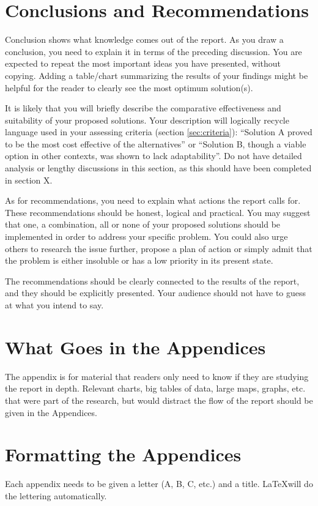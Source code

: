 \documentclass[peerreview]{IEEEtran}
\begin{document}
\section{Conclusions and Recommendations}
Conclusion shows what knowledge comes out of the report. As you draw a conclusion, you need to explain it in terms of the preceding discussion. You are expected to repeat the most important ideas you have presented, without copying. Adding a table/chart summarizing the results of your findings might be helpful for the reader to clearly see the most optimum solution(s).

It is likely that you will briefly describe the comparative effectiveness and suitability of your proposed solutions. Your description will logically recycle language used in your assessing criteria (section \ref{sec:criteria}): ``Solution A proved to be the most cost effective of the alternatives'' or ``Solution B, though a viable option in other contexts, was shown to lack adaptability''.  Do not have detailed analysis or lengthy discussions in this section, as this should have been completed in section X.

As for recommendations, you need to explain what actions the report calls for. These recommendations should be honest, logical and practical. You may suggest that one, a combination, all or none of your proposed solutions should be implemented in order to address your specific problem. You could also urge others to research the issue further, propose a plan of action or simply admit that the problem is either insoluble or has a low priority in its present state.

The recommendations should be clearly connected to the results of the report, and they should be explicitly presented. Your audience should not have to guess at what you intend to say.




\appendices
\section{What Goes in the Appendices} \label{App:WhatGoes}
The appendix is for material that readers only need to know if they are studying the report in depth. Relevant charts, big tables of data, large maps, graphs, etc. that were part of the research, but would distract the flow of the report should be given in the Appendices.
\section{Formatting the Appendices} \label{App:Formatting}
Each appendix needs to be given a letter (A, B, C, etc.) and a title. \LaTeX will do the lettering automatically.
\end{document}
